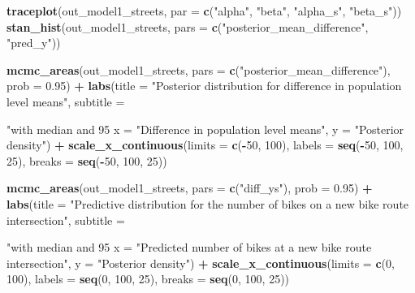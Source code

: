 \documentclass[
]{article}
\newenvironment{Shaded}{\begin{snugshade}}{\end{snugshade}}
\newcommand{\DataTypeTok}[1]{\textcolor[rgb]{0.13,0.29,0.53}{#1}}
\newcommand{\DecValTok}[1]{\textcolor[rgb]{0.00,0.00,0.81}{#1}}
\newcommand{\FloatTok}[1]{\textcolor[rgb]{0.00,0.00,0.81}{#1}}
\newcommand{\KeywordTok}[1]{\textcolor[rgb]{0.13,0.29,0.53}{\textbf{#1}}}
\newcommand{\NormalTok}[1]{#1}
\newcommand{\OperatorTok}[1]{\textcolor[rgb]{0.81,0.36,0.00}{\textbf{#1}}}
\newcommand{\StringTok}[1]{\textcolor[rgb]{0.31,0.60,0.02}{#1}}
\begin{document}
\begin{Shaded}
\begin{Highlighting}[]
{{\KeywordTok{traceplot}\NormalTok{(out_model1_streets, }\DataTypeTok{par =} \KeywordTok{c}\NormalTok{(}\StringTok{"alpha"}\NormalTok{, }\StringTok{"beta"}\NormalTok{, }\StringTok{"alpha_s"}\NormalTok{, }\StringTok{"beta_s"}\NormalTok{))}
\KeywordTok{stan_hist}\NormalTok{(out_model1_streets, }\DataTypeTok{pars =} \KeywordTok{c}\NormalTok{(}\StringTok{"posterior_mean_difference"}\NormalTok{, }\StringTok{"pred_y"}\NormalTok{))}


\KeywordTok{mcmc_areas}\NormalTok{(out_model1_streets,}
           \DataTypeTok{pars =} \KeywordTok{c}\NormalTok{(}\StringTok{"posterior_mean_difference"}\NormalTok{),}
           \DataTypeTok{prob =} \FloatTok{0.95}\NormalTok{) }\OperatorTok{+}
\StringTok{  }\KeywordTok{labs}\NormalTok{(}\DataTypeTok{title =} \StringTok{"Posterior distribution for difference in population level means"}\NormalTok{,}
       \DataTypeTok{subtitle =} \StringTok{"with median and 95%
       \DataTypeTok{x =} \StringTok{"Difference in population level means"}\NormalTok{,}
       \DataTypeTok{y =} \StringTok{"Posterior density"}\NormalTok{) }\OperatorTok{+}
\StringTok{  }\KeywordTok{scale_x_continuous}\NormalTok{(}\DataTypeTok{limits =} \KeywordTok{c}\NormalTok{(}\OperatorTok{-}\DecValTok{50}\NormalTok{, }\DecValTok{100}\NormalTok{),}
                     \DataTypeTok{labels =} \KeywordTok{seq}\NormalTok{(}\OperatorTok{-}\DecValTok{50}\NormalTok{, }\DecValTok{100}\NormalTok{, }\DecValTok{25}\NormalTok{),}
                     \DataTypeTok{breaks =} \KeywordTok{seq}\NormalTok{(}\OperatorTok{-}\DecValTok{50}\NormalTok{, }\DecValTok{100}\NormalTok{, }\DecValTok{25}\NormalTok{))}
  
\KeywordTok{mcmc_areas}\NormalTok{(out_model1_streets,}
           \DataTypeTok{pars =} \KeywordTok{c}\NormalTok{(}\StringTok{"diff_ys"}\NormalTok{),}
           \DataTypeTok{prob =} \FloatTok{0.95}\NormalTok{) }\OperatorTok{+}
\StringTok{  }\KeywordTok{labs}\NormalTok{(}\DataTypeTok{title =} \StringTok{"Predictive distribution for the number of bikes on a new bike route intersection"}\NormalTok{,}
       \DataTypeTok{subtitle =} \StringTok{"with median and 95%
       \DataTypeTok{x =} \StringTok{"Predicted number of bikes at a new bike route intersection"}\NormalTok{,}
       \DataTypeTok{y =} \StringTok{"Posterior density"}\NormalTok{) }\OperatorTok{+}
\StringTok{  }\KeywordTok{scale_x_continuous}\NormalTok{(}\DataTypeTok{limits =} \KeywordTok{c}\NormalTok{(}\DecValTok{0}\NormalTok{, }\DecValTok{100}\NormalTok{),}
                     \DataTypeTok{labels =} \KeywordTok{seq}\NormalTok{(}\DecValTok{0}\NormalTok{, }\DecValTok{100}\NormalTok{, }\DecValTok{25}\NormalTok{),}
                     \DataTypeTok{breaks =} \KeywordTok{seq}\NormalTok{(}\DecValTok{0}\NormalTok{, }\DecValTok{100}\NormalTok{, }\DecValTok{25}\NormalTok{))}

}}}}
\end{Highlighting}
\end{Shaded}
\end{document}
